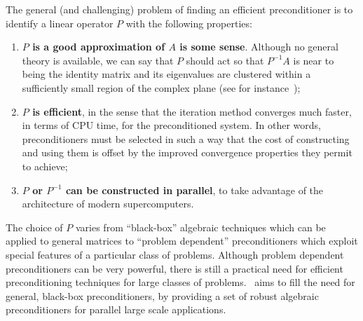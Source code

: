 The general (and challenging) problem of finding an efficient
preconditioner is to identify a linear operator $P$ with the following
properties:
\begin{enumerate}
\item {\bf $P$ is a good approximation of $A$ is some sense}. Although no
  general theory is available, we can say that $P$ should act so that
  $P^{-1} A$ is near to being the identity matrix and its eigenvalues
  are clustered within a sufficiently small region of the complex plane 
  (see for instance~\cite{greenbaum97iterative});
\item {\bf $P$ is efficient}, in the sense that the iteration method converges
  much faster, in terms of CPU time, for the preconditioned system.  In
  other words, preconditioners must be selected in such a way that the
  cost of constructing and using them is offset by the improved
  convergence properties they permit to achieve;
\item {\bf $P$ or $P^{-1}$ can be constructed in parallel}, to take advantage of the architecture of modern supercomputers.
\end{enumerate}

The choice of $P$ varies from ``black-box'' algebraic techniques which
can be applied to general matrices to ``problem dependent''
preconditioners which exploit special features of a particular class
of problems. Although problem dependent preconditioners can be very
powerful, there is still a practical need for efficient
preconditioning techniques for large classes of problems. \ifpack\ aims to
fill the need for general, black-box preconditioners, by providing a set of
robust algebraic preconditioners for parallel large scale applications.

